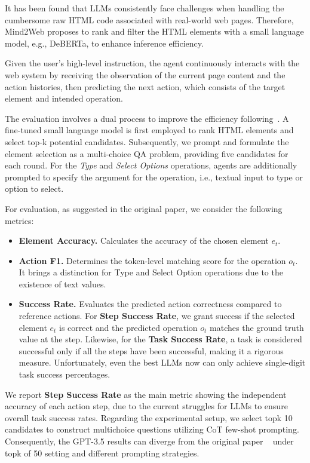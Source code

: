 It has been found that LLMs consistently face challenges when handling the cumbersome raw HTML code associated with real-world web pages. 
Therefore, Mind2Web proposes to rank and filter the HTML elements with a small language model, e.g., DeBERTa, to enhance inference efficiency. 

Given the user's high-level instruction, the agent continuously interacts with the web system by receiving the observation of the current page content and the action histories, then predicting the next action, which consists of the target element and intended operation. 

The evaluation involves a dual process to improve the efficiency following~\citep{deng2023mind2web}. 
A fine-tuned small language model is first employed to rank HTML elements and select top-k potential candidates. 
Subsequently, we prompt and formulate the element selection as a multi-choice QA problem, providing five candidates for each round. 
For the \textit{Type} and \textit{Select Options} operations, agents are additionally prompted to specify the argument for the operation, i.e., textual input to type or option to select.

For evaluation, as suggested in the original paper, we consider the following metrics: 
\begin{itemize}[leftmargin=1.5em,itemsep=0pt,parsep=0.2em,topsep=0.0em,partopsep=0.0em]
\item \textbf{Element Accuracy.} Calculates the accuracy of the chosen element $e_t$.
\item \textbf{Action F1.} Determines the token-level matching score for the operation $o_t$. It brings a distinction for Type and Select Option operations due to the existence of text values.
\item \textbf{Success Rate.} Evaluates the predicted action correctness compared to reference actions. For \textbf{Step Success Rate}, we grant success if the selected element $e_t$ is correct and the predicted operation $o_t$ matches the ground truth value at the step. Likewise, for the \textbf{Task Success Rate}, a task is considered successful only if all the steps have been successful, making it a rigorous measure. Unfortunately, even the best LLMs now can only achieve single-digit task success percentages.
\end{itemize}

We report \textbf{Step Success Rate} as the main metric showing the independent accuracy of each action step, due to the current struggles for LLMs to ensure overall task success rates. 
Regarding the experimental setup, we select topk 10 candidates to construct multichoice questions utilizing CoT few-shot prompting. Consequently, the GPT-3.5 results can diverge from the original paper ~\citep{deng2023mind2web} under topk of 50 setting and different prompting strategies.

